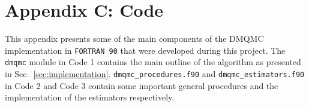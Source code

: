 \chapter{Appendix C: Code}

This appendix presents some of the main components of the DMQMC implementation in \texttt{FORTRAN 90} that were developed during this project. The \texttt{dmqmc} module in Code 1 contains the main outline of the algorithm as presented in Sec.~\ref{sec:implementation}. \texttt{dmqmc\_procedures.f90} and \texttt{dmqmc\_estimators.f90} in Code 2 and Code 3 contain some important general procedures and the implementation of the estimators respectively.



\newpage

\newpage



